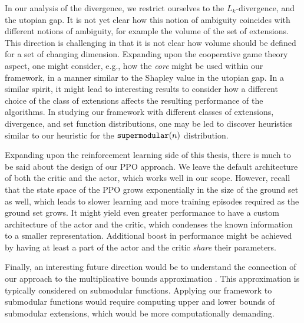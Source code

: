In our analysis of the divergence, we restrict ourselves to the $ L_k $-divergence, and the utopian gap.
It is not yet clear how this notion of ambiguity coincides with different notions of ambiguity, for example the volume of the set of extensions.
This direction is challenging in that it is not clear how volume should be defined for a set of changing dimension.
Expanding upon the cooperative game theory aspect, one might consider, e.g., how the \emph{core} might be used within our framework, in a manner similar to the Shapley value in the utopian gap.
In a similar spirit, it might lead to interesting results to consider how a different choice of the class of extensions affects the resulting performance of the algorithms.
In studying our framework with different classes of extensions, divergence, and set function distributions, one may be led to discover heuristics similar to our heuristic for the $ \texttt{supermodular}\!\left(n\right) $ distribution.

Expanding upon the reinforcement learning side of this thesis, there is much to be said about the design of our PPO approach.
We leave the default architecture of both the critic and the actor, which works well in our scope.
However, recall that the state space of the PPO grows exponentially in the size of the ground set as well, which leads to slower learning and more training episodes required as the ground set grows.
It might yield even greater performance to have a custom architecture of the actor and the critic, which condenses the known information to a smaller representation.
Additional boost in performance might be achieved by having at least a part of the actor and the critic \emph{share} their parameters.

Finally, an interesting future direction would be to understand the connection of our approach to the multiplicative bounds approximation \citep{10.5555/1496770.1496829,10.1145/3039871}.
This approximation is typically considered on submodular functions.
Applying our framework to submodular functions would require computing upper and lower bounds of submodular extensions, which would be more computationally demanding.
